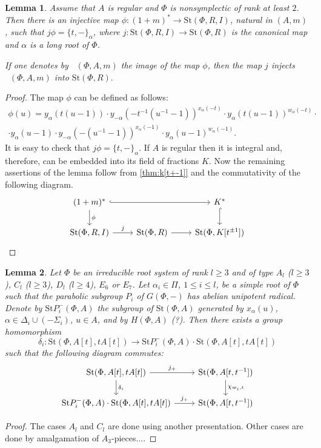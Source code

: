 \documentclass[oneside,12pt]{amsart}
\numberwithin{equation}{section}
\newtheorem{lem}{Lemma}
\numberwithin{lem}{section}
\theoremstyle{definition}
\theoremstyle{remark}
\newcommand{\Stb}{\mathrm{St}}
\DeclareMathOperator{\Stsymt}{{Sym}^t}
\begin{document}
\begin{lem}\label{lem:tul3.1zh}
Assume that $A$ is regular and $\Phi$ is nonsymplectic of rank at least $2$.
Then there is an injective map $\phi\colon (1+m)^*\to\Stb(\Phi, R, I)$, natural in $(A,m)$,
such that $j \phi = \{t, -\}_\alpha$, where $j\colon\Stb(\Phi,R,I)\to \Stb(\Phi,R)$ is the canonical map and $\alpha$ is a long root of $\Phi$.

If one denotes by $\Stsymt(\Phi, A, m)$ the image of the map $\phi$, then
 the map $j$ injects $\Stsymt(\Phi, A, m)$ into $\Stb(\Phi, R).$
\end{lem}
\begin{proof}
The map $\phi$ can be defined as follows:
\begin{multline*}
\phi(u)=y_\alpha(t(u-1)) \cdot y_{-\alpha}(-t^{-1}(u^{-1}-1))^{x_\alpha(-t)} \cdot y_\alpha(t(u-1))^{w_\alpha(-t)} \cdot \\
\cdot y_\alpha(u-1) \cdot y_{-\alpha}(-(u^{-1}-1))^{x_\alpha(-1)} \cdot y_\alpha(u-1)^{w_\alpha(-1)}.
\end{multline*}
It is easy to check that $j \phi = \{t, -\}_\alpha$.
If $A$ is regular then it is integral and, therefore, can be embedded into its field of fractions $K$.
Now the remaining assertions of the lemma follow from \cref{thm:k[t+-1]} and the commutativity of the following diagram.
\[\begin{tikzcd}
 (1+m)^* \ar[hookrightarrow, rr] \ar[d, "\phi"] &  & K^* \ar[hookrightarrow, d] \\
  \Stb(\Phi ,R, I) \ar[r, "j"]                      & \Stb(\Phi, R) \ar[r] & \Stb(\Phi, K[t^{\pm 1}])
\end{tikzcd} \qedhere\]
\end{proof}

\begin{lem}\label{lem:sigma-X}
Let $\Phi$ be an irreducible root system of rank $l\ge 3$ and of type $A_l$ ($l\ge 3$), $C_l$ ($l\ge 3$), $D_l$ ($l\ge 4$),
$E_6$ or $E_7$. Let $\alpha_i\in\Pi$, $1\le i\le l$, be a simple root of $\Phi$ such that the
parabolic subgroup $P_i$ of $G(\Phi,-)$ has abelian unipotent radical. Denote by $\Stb P_i^-(\Phi,A)$
the subgroup of $\Stb(\Phi,A)$ generated by $x_\alpha(u)$, $\alpha\in\Delta_i\cup(-\Sigma_i)$, $u\in A$,
and by $H(\Phi,A)$ (?).
Then there exists a group homomorphism
$$
\delta_i:\Stb(\Phi,A[t],tA[t])\to \Stb P_i^-(\Phi,A)\cdot \Stb(\Phi,A[t],tA[t])
$$
such that the following diagram commutes:
 \[\begin{tikzcd}
\Stb(\Phi,A[t],tA[t]) \arrow[r, "j_+"] \arrow[d, "\delta_i"] & \Stb(\Phi,A[t, t^{-1}])  \ar[d, "\chi_{\varpi_i,t}"] \\
\Stb P_i^-(\Phi,A)\cdot \Stb(\Phi,A[t],tA[t]) \arrow[r, "j_+"] &  \Stb(\Phi,A[t, t^{-1}])
\end{tikzcd}\]
\end{lem}
\begin{proof}
The cases $A_l$ and $C_l$ are done using another presentation. Other cases are done by amalgamation
of $A_3$-pieces....
\end{proof}
\end{document}
